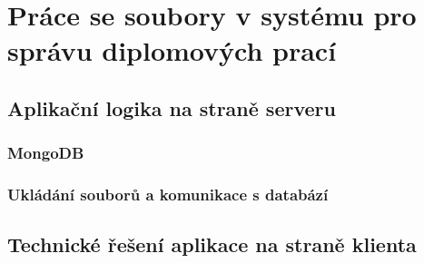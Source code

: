 \chapter{Práce se soubory v systému pro správu diplomových prací}
\blindtext

\section{Aplikační logika na straně serveru}
\blindtext[2]

\subsection{MongoDB}
\blindtext[1]

\subsection{Ukládání souborů a komunikace s databází}
\blindtext[1]

\section{Technické řešení aplikace na straně klienta}
\blindtext[2]
